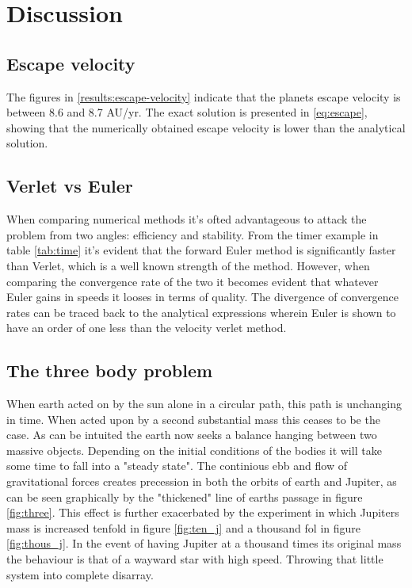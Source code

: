 \section{Discussion}
\subsection{Escape velocity}
The figures in \ref{results:escape-velocity} indicate that the planets escape velocity is between
8.6 and 8.7 AU/yr. The exact solution is presented in \ref{eq:escape}, showing that the numerically
obtained escape velocity is lower than the analytical solution.

\subsection{Verlet vs Euler}

When comparing numerical methods it's ofted advantageous to attack the problem from two angles: efficiency and stability. From the timer example in table \ref{tab:time} it's evident that the forward Euler method is significantly  faster than Verlet, which is a well known strength of the method. However, when comparing the convergence rate of the two it becomes evident that whatever Euler gains in speeds it looses in terms of quality. The divergence of convergence rates can be traced back to the analytical expressions wherein Euler is shown to have an order of one less than the velocity verlet method.

\subsection{The three body problem}
When earth acted on by the sun alone in a circular path, this path is unchanging in time. When acted upon by a second substantial mass this ceases to be the case. As can be intuited the earth now seeks a balance hanging between two massive objects. Depending on the initial conditions of the bodies it will take some time to fall into a "steady state". The continious ebb and flow of gravitational forces creates precession in both the orbits of earth and Jupiter, as can be seen graphically by the "thickened" line of earths passage in figure \ref{fig:three}. This effect is further exacerbated by  the experiment in which Jupiters mass is increased tenfold in figure \ref{fig:ten_j} and a thousand fol in figure \ref{fig:thous_j}.
In the event of having Jupiter at a thousand times its original mass the behaviour is that of a wayward star with high speed. Throwing that little system into complete disarray.   

